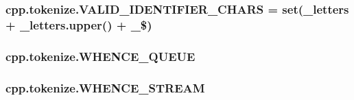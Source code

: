 \subsubsection[{\texorpdfstring{V\+A\+L\+I\+D\+\_\+\+I\+D\+E\+N\+T\+I\+F\+I\+E\+R\+\_\+\+C\+H\+A\+RS}{VALID_IDENTIFIER_CHARS}}]{\setlength{\rightskip}{0pt plus 5cm}cpp.\+tokenize.\+V\+A\+L\+I\+D\+\_\+\+I\+D\+E\+N\+T\+I\+F\+I\+E\+R\+\_\+\+C\+H\+A\+RS = {\bf set}(\+\_\+letters + \+\_\+letters.\+upper() + \textquotesingle{}\+\_\$\textquotesingle{})}\hypertarget{namespacecpp_1_1tokenize_a733f1cf605b1630fb6a0a7f30aaefbec}{}\label{namespacecpp_1_1tokenize_a733f1cf605b1630fb6a0a7f30aaefbec}
\subsubsection[{\texorpdfstring{W\+H\+E\+N\+C\+E\+\_\+\+Q\+U\+E\+UE}{WHENCE_QUEUE}}]{\setlength{\rightskip}{0pt plus 5cm}cpp.\+tokenize.\+W\+H\+E\+N\+C\+E\+\_\+\+Q\+U\+E\+UE}\hypertarget{namespacecpp_1_1tokenize_ad02466a473c5e9c2ac256e18209f0967}{}\label{namespacecpp_1_1tokenize_ad02466a473c5e9c2ac256e18209f0967}
\subsubsection[{\texorpdfstring{W\+H\+E\+N\+C\+E\+\_\+\+S\+T\+R\+E\+AM}{WHENCE_STREAM}}]{\setlength{\rightskip}{0pt plus 5cm}cpp.\+tokenize.\+W\+H\+E\+N\+C\+E\+\_\+\+S\+T\+R\+E\+AM}\hypertarget{namespacecpp_1_1tokenize_a8dd117207e391864f7d9cb656e826a9e}{}\label{namespacecpp_1_1tokenize_a8dd117207e391864f7d9cb656e826a9e}
